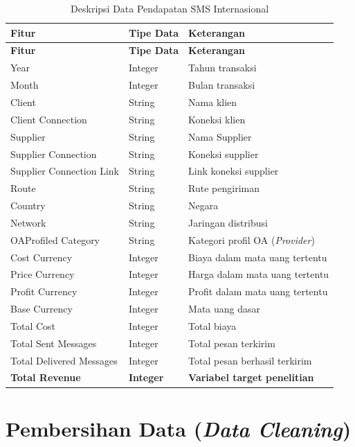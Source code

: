     \begin{longtable}{lll}
    \caption{Deskripsi Data Pendapatan SMS Internasional} \\
    \toprule
    \textbf{Fitur} & \textbf{Tipe Data} & \textbf{Keterangan} \\
    \midrule
    \endfirsthead
    
    \toprule
    \textbf{Fitur} & \textbf{Tipe Data} & \textbf{Keterangan} \\
    \midrule
    \endhead
    
    Year & Integer & Tahun transaksi \\
    Month & Integer & Bulan transaksi \\
    Client & String & Nama klien \\
    Client Connection & String & Koneksi klien \\
    Supplier & String & Nama Supplier \\
    Supplier Connection & String & Koneksi supplier \\
    Supplier Connection Link & String & Link koneksi supplier \\
    Route & String & Rute pengiriman \\
    Country & String & Negara \\
    Network & String & Jaringan distribusi \\
    OAProfiled Category & String & Kategori profil OA (\textit{Provider}) \\
    Cost Currency & Integer & Biaya dalam mata uang tertentu \\
    Price Currency & Integer & Harga dalam mata uang tertentu \\
    Profit Currency & Integer & Profit dalam mata uang tertentu \\
    Base Currency & Integer & Mata uang dasar \\
    Total Cost & Integer & Total biaya \\
    Total Sent Messages & Integer & Total pesan terkirim \\
    Total Delivered Messages & Integer & Total pesan berhasil terkirim \\
    \textbf{Total Revenue} & \textbf{Integer} & \textbf{Variabel target penelitian} \\
    \bottomrule
    \end{longtable}
    
\section{Pembersihan Data (\textit{Data Cleaning})}
\label{sec:prapra-pemrosesan_data}

